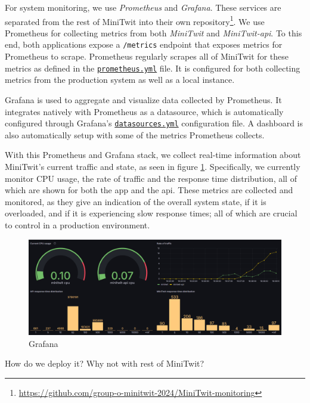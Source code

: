 \documentclass[11pt]{article}
\begin{document}
For system monitoring, we use \textit{Prometheus} and \textit{Grafana}. These services are separated from the rest of MiniTwit into their own repository\footnote{\url{https://github.com/group-o-minitwit-2024/MiniTwit-monitoring}}. We use Prometheus for collecting metrics from both \textit{MiniTwit} and \textit{MiniTwit-api}. To this end, both applications expose a \texttt{/metrics} endpoint that exposes metrics for Prometheus to scrape. Prometheus regularly scrapes all of MiniTwit for these metrics as defined in the \href{https://github.com/group-o-minitwit-2024/MiniTwit-monitoring/blob/main/prometheus/prometheus.yml}{\texttt{prometheus.yml}} file. It is configured for both collecting metrics from the production system as well as a local instance. 

Grafana is used to aggregate and visualize data collected by Prometheus. It integrates natively with Prometheus as a datasource, which is automatically configured through Grafana's \href{https://github.com/group-o-minitwit-2024/MiniTwit-monitoring/blob/main/grafana/provisioning/datasources/datasources.yaml}{\texttt{datasources.yml}} configuration file. A dashboard is also automatically setup with some of the metrics Prometheus collects. 

With this Prometheus and Grafana stack, we collect real-time information about MiniTwit's current traffic and state, as seen in figure \ref{fig:grafana}. Specifically, we currently monitor CPU usage, the rate of traffic and the response time distribution, all of which are shown for both the app and the api. These metrics are collected and monitored, as they give an indication of the overall system state, if it is overloaded, and if it is experiencing slow response times; all of which are crucial to control in a production environment. 

\begin{figure}[h]
    \centering
    \includegraphics[width=0.75\linewidth]{report/images/grafana.png}
    \caption{Grafana}
    \label{fig:grafana}
\end{figure}

How do we deploy it?
    Why not with rest of MiniTwit?
\end{document}
